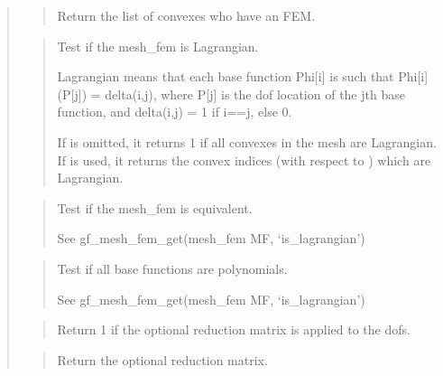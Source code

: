 \documentclass[a4paper,11pt,english]{sphinxmanual}
\begin{document}
\begin{quote}
\begin{quote}
Return the list of convexes who have an FEM.
\end{quote}

\begin{quote}

Test if the mesh\_fem is Lagrangian.

Lagrangian means that each base function Phi{[}i{]} is such that
Phi{[}i{]}(P{[}j{]}) = delta(i,j), where P{[}j{]} is the dof location of
the jth base function, and delta(i,j) = 1 if i==j, else 0.

If  is omitted, it returns 1 if all convexes in the mesh
are Lagrangian. If  is used, it returns the convex indices
(with respect to ) which are Lagrangian.
\end{quote}

\begin{quote}

Test if the mesh\_fem is equivalent.

See gf\_mesh\_fem\_get(mesh\_fem MF, ‘is\_lagrangian’)
\end{quote}

\begin{quote}

Test if all base functions are polynomials.

See gf\_mesh\_fem\_get(mesh\_fem MF, ‘is\_lagrangian’)
\end{quote}

\begin{quote}

Return 1 if the optional reduction matrix is applied to the dofs.
\end{quote}

\begin{quote}

Return the optional reduction matrix.
\end{quote}


\end{quote}
\end{document}
